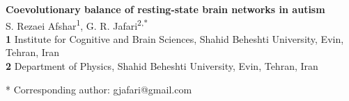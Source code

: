 \documentclass[10pt,letterpaper]{article}
\begin{document}
\vspace*{0.2in}

\begin{flushleft}
{\Large
\textbf{Coevolutionary balance of resting-state brain networks in autism}
}
\newline
\\
S. Rezaei Afshar\textsuperscript{1},
G. R. Jafari\textsuperscript{2,*}
\\
\bigskip
\textbf{1} Institute for Cognitive and Brain Sciences, Shahid Beheshti University, Evin, Tehran, Iran
\\
\textbf{2} Department of Physics, Shahid Beheshti University, Evin, Tehran, Iran
\\
\bigskip

* Corresponding author: gjafari@gmail.com

\end{flushleft}

\end{document}
